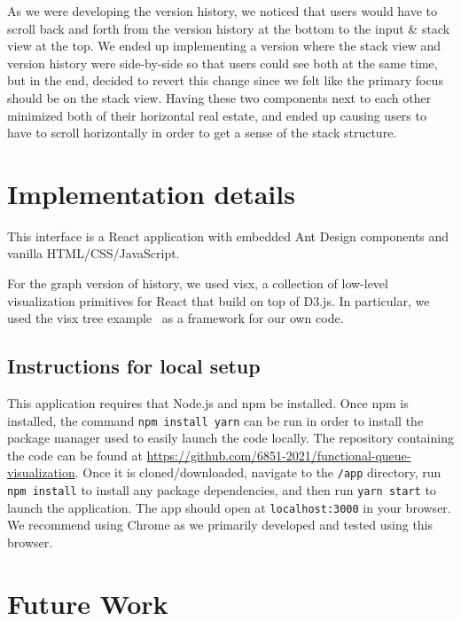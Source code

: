 \documentclass[runningheads]{llncs}
\newcommand{\todo}[1]{{\leavevmode\textcolor{red}{\sf \bf [#1]}}}
\begin{document}
As we were developing the version history, we noticed that users would have to scroll back and forth from the version history at the bottom to the input \& stack view at the top. We ended up implementing a version where the stack view and version history were side-by-side so that users could see both at the same time, but in the end, decided to revert this change since we felt like the primary focus should be on the stack view. Having these two components next to each other minimized both of their horizontal real estate, and ended up causing users to have to scroll horizontally in order to get a sense of the stack structure.


\section{Implementation details}
This interface is a React application with embedded Ant Design components and vanilla HTML/CSS/JavaScript. 

For the graph version of history, we used visx, a collection of low-level visualization primitives for React that build on top of D3.js. In particular, we used the visx tree example~\cite{vx-example} as a framework for our own code.

\subsection{Instructions for local setup}

This application requires that Node.js and npm be installed. Once npm is installed, the command \texttt{npm install yarn} can be run in order to install the package manager used to easily launch the code locally. The repository containing the code can be found at \href{https://github.com/6851-2021/functional-queue-visualization}{https://github.com/6851-2021/functional-queue-visualization}. Once it is cloned/downloaded, navigate to the \texttt{/app} directory, run \texttt{npm install} to install any package dependencies, and then run \texttt{yarn start} to launch the application. The app should open at \texttt{localhost:3000} in your browser. We recommend using Chrome as we primarily developed and tested using this browser. %

\section{Future Work}
\end{document}

